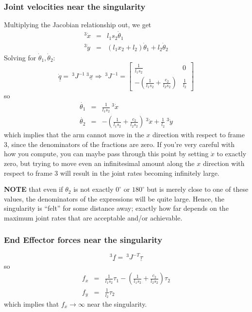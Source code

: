 \documentclass[]{article}
\begin{document}
\subsubsection{Joint velocities near the singularity}
Multiplying the Jacobian relationship out, we get
\begin{eqnarray}
^{3}\dot{x} & = & l_{1}s_{2}\dot{\theta}_{1} \nonumber \\
^{3}\dot{y} & = & (l_{1}x_{2}+l_{2})\dot{\theta}_{1} + l_{2}\dot{\theta}_{2} \nonumber
\end{eqnarray}
Solving for $\dot{\theta}_{1}, \dot{\theta}_{2}$:
\begin{displaymath}
	\dot{\underline{q}} = \ \!^{3}J^{-1}\ \!^{3}\underline{x} \Rightarrow \ \!^{3}J^{-1} = \left[\begin{array}{cc} \frac{1}{l_{1}s_{2}} & 0 \\ -(\frac{1}{l_{1}s_{2}} + \frac{c_{2}}{l_{2}s_{2}}) & \frac{1}{l_{2}} \end{array}\right]
\end{displaymath}
so
\begin{eqnarray}
	\dot{\theta_{1}} & = & \frac{1}{l_{1}s_{2}}\ ^{3}\dot{x} \nonumber\\
	\dot{\theta_{2}} & = & -\left(\frac{1}{l_{1}s_{2}} + \frac{c_{2}}{l_{2}s_{2}}\right)\ ^{3}\dot{x} +\frac{1}{l_{2}}\ ^{3}\dot{y}\nonumber
\end{eqnarray}
which implies that the arm cannot move in the $x$ direction with respect to frame 3, since the denominators of the fractions are zero. If you're very careful with how you compute, you can maybe pass through this point by setting $\dot{x}$ to exactly zero, but trying to move even an infinitesimal amount along the $x$ direction with respect to frame 3 will result in the joint rates becoming infinitely large.

\textbf{NOTE} that even if $\theta_{2}$ is not exactly $0^{\circ}$ or $180^{\circ}$ but is merely close to one of these values, the denominators of the expressions will be quite large. Hence, the singularity is ``felt'' for some distance away; exactly how far depends on the maximum joint rates that are acceptable and/or achievable.

\subsubsection{End Effector forces near the singularity}
\begin{displaymath}
^{3}\underline{f} = \ \!^{3}J^{-T}\underline{\tau}
\end{displaymath}
so
\begin{eqnarray}
	f_{x} & = & \frac{1}{l_{1}s_{2}}\tau_{1} - \left(\frac{1}{l_{1}s_{2}} + \frac{c_{2}}{l_{2}s_{2}}\right) \tau_{2} \nonumber \\
	f_{y} & = & \frac{1}{l_{2}}\tau_{2} \nonumber
\end{eqnarray}
which implies that $f_{x} \rightarrow \infty$ near the singularity.
\end{document}
